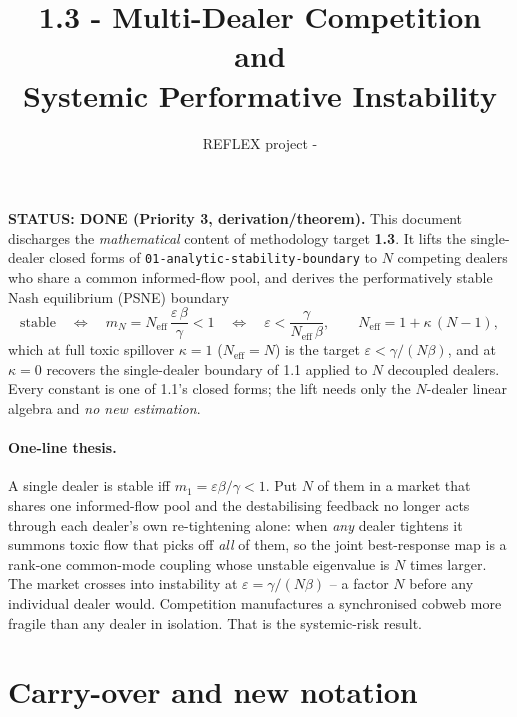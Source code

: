 \documentclass[11pt]{article}
\title{\textbf{1.3 - Multi-Dealer Competition and\\ Systemic Performative Instability}}
\author{REFLEX project - \code{math-theory}}
\date{}
\newcommand{\eps}{\varepsilon}
\newcommand{\code}[1]{\texttt{#1}}
\newcommand{\Neff}{N_{\mathrm{eff}}}
\begin{document}
\maketitle

\noindent\textbf{STATUS: DONE (Priority 3, derivation/theorem).} This document
discharges the \emph{mathematical} content of methodology target \textbf{1.3}. It
lifts the single-dealer closed forms of
\code{01-analytic-stability-boundary} to $N$ competing dealers who share a common
informed-flow pool, and derives the performatively stable Nash equilibrium (PSNE)
boundary
%
\begin{equation*}
  \text{stable}\quad\Longleftrightarrow\quad
  m_N = \Neff\,\frac{\eps\,\beta}{\gamma} < 1
  \quad\Longleftrightarrow\quad
  \eps < \frac{\gamma}{\Neff\,\beta},
  \qquad \Neff = 1 + \kappa\,(N-1),
\end{equation*}
%
which at full toxic spillover $\kappa=1$ ($\Neff=N$) is the target
$\eps < \gamma/(N\beta)$, and at $\kappa=0$ recovers the single-dealer boundary of
1.1 applied to $N$ decoupled dealers. Every constant is one of 1.1's closed forms;
the lift needs only the $N$-dealer linear algebra and \emph{no new estimation}.

\paragraph{One-line thesis.}
A single dealer is stable iff $m_1=\eps\beta/\gamma<1$. Put $N$ of them in a market
that shares one informed-flow pool and the destabilising feedback no longer acts
through each dealer's own re-tightening alone: when \emph{any} dealer tightens it
summons toxic flow that picks off \emph{all} of them, so the joint best-response
map is a rank-one common-mode coupling whose unstable eigenvalue is $N$ times
larger. The market crosses into instability at $\eps=\gamma/(N\beta)$ -- a factor
$N$ before any individual dealer would. Competition manufactures a synchronised
cobweb more fragile than any dealer in isolation. That is the systemic-risk result.

\section{Carry-over and new notation}
\end{document}
